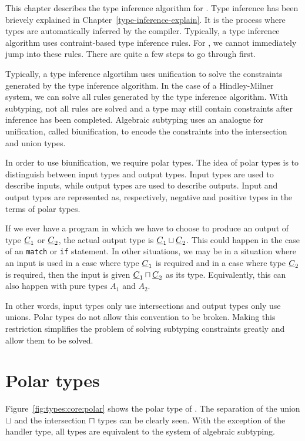 This chapter describes the type inference algorithm for \core. Type inference has been brievely explained in Chapter~\ref{type-inference-explain}. It is the process where types are automatically inferred by the compiler. Typically, a type inference algorithm uses contraint-based type inference rules. For \core, we cannot immediately jump into these rules. There are quite a few steps to go through first. 

Typically, a type inference algortihm uses unification to solve the constraints generated by the type inference algorithm. In the case of a Hindley-Milner system, we can solve all rules generated by the type inference algorithm. With subtyping, not all rules are solved and a type may still contain constraints after inference has been completed. Algebraic subtyping uses an analogue for unification, called biunification, to encode the constraints into the intersection and union types.

In order to use biunification, we require polar types. The idea of polar types is to distinguish between input types and output types. Input types are used to describe inputs, while output types are used to describe outputs. Input and output types are represented as, respectively, negative and positive types in the terms of polar types. 

If we ever have a program in which we have to choose to produce an output of type $\underline{C}_1$ or $\underline{C}_2$, the actual output type is $\underline{C}_1 \sqcup \underline{C}_2$. This could happen in the case of an \texttt{match} or \texttt{if} statement. In other situations, we may be in a situation where an input is used in a case where type $\underline{C}_1$ is required and in a case where type $\underline{C}_2$ is required, then the input is given $\underline{C}_1 \sqcap \underline{C}_2$ as its type. Equivalently, this can also happen with pure types $A_1$ and $A_2$.  

In other words, input types only use intersections and output types only use unions. Polar types do not allow this convention to be broken. Making this restriction simplifies the problem of solving subtyping constraints greatly and allow them to be solved. \cite{dolan2017algebraic, pottier1998type} 

\section{Polar types}\label{polarity}

Figure~\ref{fig:types:core:polar} shows the polar type of \core. The separation of the union $\sqcup$ and the intersection $\sqcap$ types can be clearly seen. With the exception of the handler type, all types are equivalent to the system of algebraic subtyping. 

